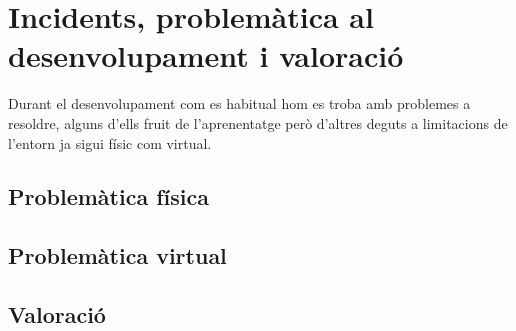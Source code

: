 \section{Incidents, problemàtica al desenvolupament i valoració}\label{incidents}

Durant el desenvolupament com es habitual hom es troba amb problemes a resoldre,
alguns d'ells fruit de l'aprenentatge però d'altres deguts a limitacions
de l'entorn ja sigui físic com virtual.

\subsection{Problemàtica física}


\subsection{Problemàtica virtual}

\subsection{Valoració}

